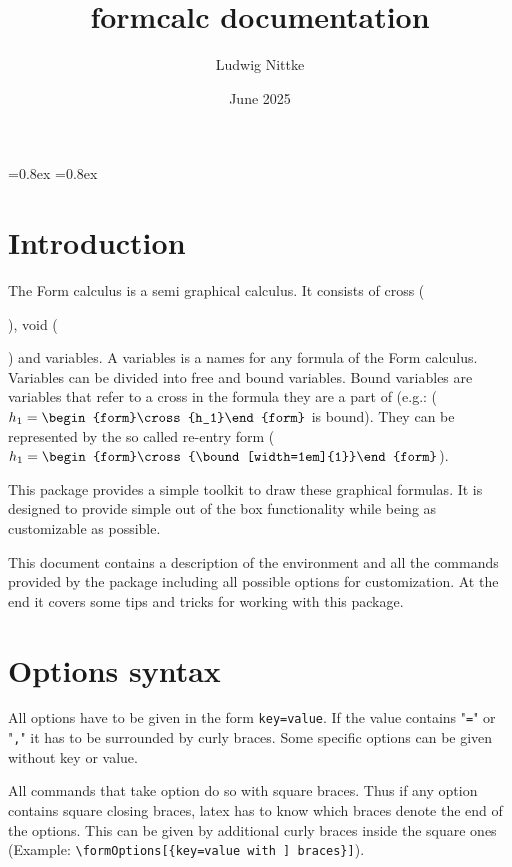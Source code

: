 \documentclass[parskip=half-]{scrartcl}
\title{formcalc documentation}
\author{Ludwig Nittke}
\date{June 2025}
\begin{document}
\lineskiplimit=0.8ex
\lineskip=0.8ex

\maketitle

\tableofcontents

\section{Introduction}

The Form calculus is a semi graphical calculus. It consists of cross (\begin{form}\cross{}\end{form}), void (\begin{form}\void\end{form}) and variables. A variables is a names for any formula of the Form calculus. Variables can be divided into free and bound variables. Bound variables are variables that refer to a cross in the formula they are a part of (e.g.: (\(h_1=\begin{form}\cross{h_1}\end{form}\) is bound). They can be represented by the so called re-entry form (\(h_1=\begin{form}\cross{\bound[width=1em]{1}}\end{form}\)).

This package provides a simple toolkit to draw these graphical formulas. It is designed to provide simple out of the box functionality while being as customizable as possible.

This document contains a description of the environment and all the commands provided by the package including all possible options for customization. At the end it covers some tips and tricks for working with this package.

\section{Options syntax}

All options have to be given in the form \verb|key=value|. If the value contains "\verb|=|" or "\verb|,|" it has to be surrounded by curly braces. Some specific options can be given without key or value.

All commands that take option do so with square braces. Thus if any option contains square closing braces, latex has to know which braces denote the end of the options. This can be given by additional curly braces inside the square ones (Example: \verb|\formOptions[{key=value with ] braces}]|).
\end{document}
